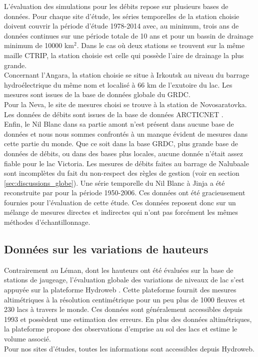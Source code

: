 L'évaluation des simulations pour les débits repose sur plusieurs bases de données. Pour chaque site d'étude, les séries temporelles de la station choisie doivent couvrir la période d'étude 1978-2014 avec, au minimum, trois ans de données continues sur une période totale de 10 ans et pour un bassin de drainage minimum de 10000 km$^{2}$. Dans le cas où deux stations se trouvent sur la même maille CTRIP, la station choisie est celle qui possède l'aire de drainage la plus grande.\\
Concernant l'Angara, la station choisie se situe à Irkoutsk au niveau du barrage hydroélectrique du même nom et localisé à 66 km de l'exutoire du lac. Les mesures sont issues de la base de données globale du GRDC.\\
Pour la Neva, le site de mesures choisi se trouve à la station de Novosaratovka. Les données de débits sont issues de la base de données ARCTICNET \citep{lammers2001}.\\
Enfin, le Nil Blanc dans sa partie amont n'est présent dans aucune base de données et nous nous sommes confrontés à un manque évident de mesures dans cette partie du monde. Que ce soit dans la base GRDC, plus grande base de données de débits, ou dans des bases plus locales, aucune donnée n'était assez fiable pour le lac Victoria. Les mesures de débits faites au barrage de Nalubaale sont incomplètes du fait du non-respect des règles de gestion (voir en section \ref{sec:discussions_globe}). Une série temporelle du Nil Blanc à Jinja a été reconstruite par \citet{vanderkelen2018a} pour la période 1950-2006. Ces données ont été gracieusement fournies pour l'évaluation de cette étude. Ces données reposent donc sur un mélange de mesures directes et indirectes qui n'ont pas forcément les mêmes méthodes d'échantillonnage.
\clearpage
\subsection*{{\selectfont Données sur les variations de hauteurs}}

Contrairement au Léman, dont les hauteurs ont été évaluées sur la base de stations de jaugeage, l'évaluation globale des variations de niveaux de lac s'est appuyée sur la plateforme Hydroweb  \citep[\url{http://hydroweb.theia-land.fr/}]{cretaux2011}. Cette plateforme fournit des mesures altimétriques à la résolution centimétrique pour un peu plus de 1000 fleuves et 230 lacs à travers le monde. Ces données sont généralement accessibles depuis 1993 et possèdent une estimation des erreurs. En plus des données altimétriques, la plateforme propose des observations d'emprise au sol des lacs et estime le volume associé.\\
Pour nos sites d'études, toutes les informations sont accessibles depuis Hydroweb.


